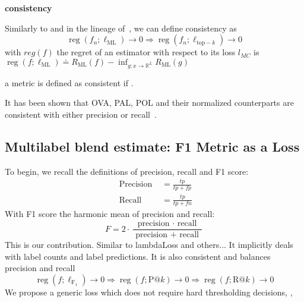 \textbf{consistency}

Similarly to \citet{multilabelReduction} and in the lineage of~\citep{consistency-surrogates, consistency-multiclassSVM, consistency-lossAnalysis}, we can define consistency as
%
\begin{equation}
\operatorname{reg}\left(f_{n} ; \ell_{\mathrm{ML}}\right) \rightarrow 0 \Longrightarrow \operatorname{reg}\left(f_{n} ; \ell_{\mathrm{top}-k}\right) \rightarrow 0
\end{equation}
%
with $reg(f)$ the regret of an estimator with respect to its loss $l_{MC}$ is $\operatorname{reg}\left(f ; \ell_{\mathrm{ML}}\right) \doteq R_{\mathrm{ML}}(f)-\inf _{g: x \rightarrow \mathbb{R}^{L}} R_{\mathrm{ML}}(g)$

a metric is defined as consistent if .

It has been shown that OVA, PAL, POL and their normalized counterparts are consistent with either precision or recall~\cite{multilabelReduction}. 


\subsection{Multilabel blend estimate: F1 Metric as a Loss}
\label{section:background:metricsAsLosses}

To begin, we recall the definitions of precision, recall and F1 score:
%
\begin{equation}
	\begin{aligned} 
		\text { Precision } &=\frac{t p}{t p+f p} \\ 
		\text{ Recall } &=\frac{t p}{t p+f n} 
	\end{aligned}
\end{equation}
%
With F1 score the harmonic mean of precision and recall:
%
\begin{equation}
F=2 \cdot \frac{\text { precision } \cdot \text { recall }}{\text { precision }+\text { recall }}
\end{equation}
%
This is our contribution. Similar to lambdaLoss and others... It implicitly deals with label counts and label predictions. It is also consistent and balances precision and recall 
%
\begin{equation}
\operatorname{reg}\left(f ; \ell_{\mathrm{F_1}}\right) \rightarrow 0 \Longrightarrow \operatorname{reg}\left(f ; \mathrm{P} @ k\right) \rightarrow 0 \Longrightarrow \operatorname{reg}\left(f ; \mathrm{R} @ k\right) \rightarrow 0
\end{equation}
%
We propose a generic loss which does not require hard thresholding decisions, , 

